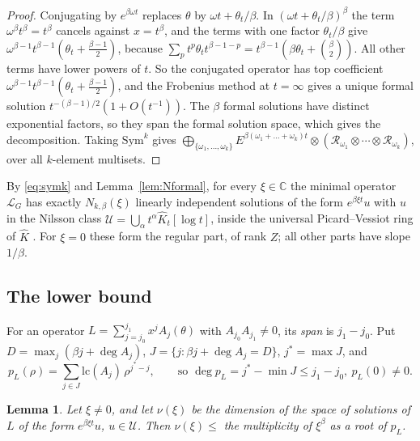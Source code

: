 \documentclass[11pt]{amsart}
\newtheorem{lemma}[thm]{Lemma}
\theoremstyle{definition}
\newcommand{\C}{\mathbb C}
\newcommand{\Sym}{\mathrm{Sym}}
\newcommand{\lc}{\mathrm{lc}}
\begin{document}
\begin{proof}
Conjugating by $e^{\beta\omega t}$ replaces $\theta$ by $\omega t+\theta_t/\beta$. In $(\omega t+\theta_t/\beta)^\beta$ the term $\omega^\beta t^\beta=t^\beta$ cancels against $x=t^\beta$, and the terms with one factor $\theta_t/\beta$ give $\omega^{\beta-1}t^{\beta-1}(\theta_t+\frac{\beta-1}2)$, because $\sum_{p}t^p\theta_tt^{\beta-1-p}=t^{\beta-1}(\beta\theta_t+\binom\beta2)$. All other terms have lower powers of $t$. So the conjugated operator has top coefficient $\omega^{\beta-1}t^{\beta-1}(\theta_t+\frac{\beta-1}2)$, and the Frobenius method at $t=\infty$ gives a unique formal solution $t^{-(\beta-1)/2}(1+O(t^{-1}))$. The $\beta$ formal solutions have distinct exponential factors, so they span the formal solution space, which gives the decomposition. Taking $\Sym^k$ gives $\bigoplus_{\{\omega_1,\dots,\omega_k\}}E^{\beta(\omega_1+\dots+\omega_k)t}\otimes(\mathcal R_{\omega_1}\otimes\cdots\otimes\mathcal R_{\omega_k})$, over all $k$-element multisets.
\end{proof}

By \eqref{eq:symk} and Lemma~\ref{lem:Nformal}, for every $\xi\in\C$ the minimal operator $\mathcal L_G$ has exactly $N_{k,\beta}(\xi)$ linearly independent solutions of the form $e^{\beta\xi t}u$ with $u$ in the Nilsson class $\mathcal U=\bigcup_\alpha t^\alpha\hat K_t[\log t]$, inside the universal Picard--Vessiot ring of $\hat K$ \cite[Ch.~3]{vdPS03}. For $\xi=0$ these form the regular part, of rank $Z$; all other parts have slope $1/\beta$.

\subsection{The lower bound}
For an operator $L=\sum_{j=j_0}^{j_1}x^jA_j(\theta)$ with $A_{j_0}A_{j_1}\ne0$, its \emph{span} is $j_1-j_0$. Put $D=\max_j(\beta j+\deg A_j)$, $J=\{j:\beta j+\deg A_j=D\}$, $j^*=\max J$, and
\[
p_L(\rho)=\sum_{j\in J}\lc(A_j)\,\rho^{j^*-j},\qquad\text{so }\deg p_L=j^*-\min J\le j_1-j_0,\ p_L(0)\ne0 .
\]

\begin{lemma}\label{lem:newton}
Let $\xi\ne0$, and let $\nu(\xi)$ be the dimension of the space of solutions of $L$ of the form $e^{\beta\xi t}u$, $u\in\mathcal U$. Then $\nu(\xi)\le$ the multiplicity of $\xi^\beta$ as a root of $p_L$.
\end{lemma}
\end{document}
